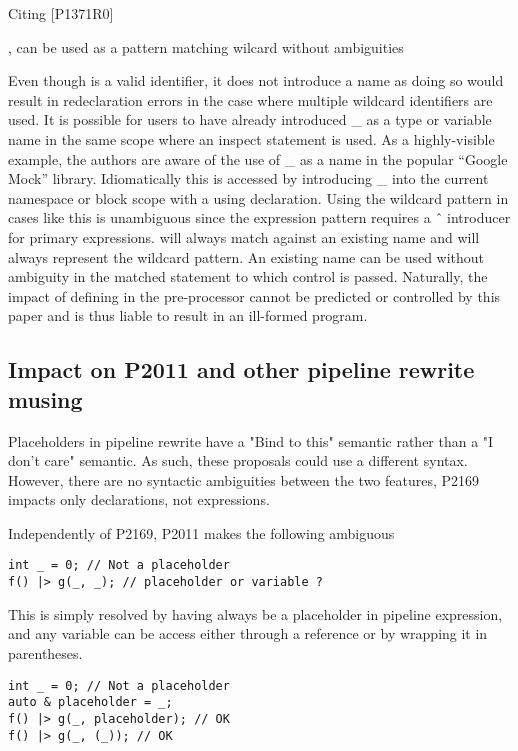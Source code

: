 \documentclass{wg21}
\begin{document}
Citing [P1371R0]{\cite{P1371R0}, \tcode{_} can be used as a pattern matching wilcard without ambiguities
    
\begin{quoteblock}
Even though \tcode{_} is a valid identifier, it does not introduce a name as doing so would result in redeclaration
errors in the case where multiple wildcard \tcode{_} identifiers are used.
It is possible for users to have already introduced _ as a type or variable name in the same scope where an
inspect statement is used. As a highly-visible example, the authors are aware of the use of _ as a name in
the popular “Google Mock” library. Idiomatically this is accessed by introducing _ into the current namespace
or block scope with a using declaration. Using the wildcard pattern in cases like this is unambiguous since
the expression pattern requires a ˆ introducer for primary expressions. \tcode{\^_} will always match against an
existing name and \tcode{_} will always represent the wildcard pattern. An existing \tcode{_} name can be used without
ambiguity in the matched statement to which control is passed.
Naturally, the impact of defining \tcode{_} in the pre-processor cannot be predicted or controlled by this paper and
is thus liable to result in an ill-formed program.
\end{quoteblock}

\subsection{Impact on P2011 and other pipeline rewrite musing}

Placeholders in pipeline rewrite have a "Bind to this" semantic rather than a "I don't care" semantic.
As such, these proposals could use a different syntax.
However, there are no syntactic ambiguities between the two features, P2169 impacts only declarations, not expressions.

Independently of P2169, P2011 makes the following ambiguous

\begin{lstlisting}[style=color]
int _ = 0; // Not a placeholder
f() |> g(_, _); // placeholder or variable ? 
\end{lstlisting}

This is simply resolved by having \tcode{_} always be a placeholder in pipeline expression,
and any \tcode{_} variable can be access either through a reference or by wrapping it in parentheses.

\begin{lstlisting}[style=color]
int _ = 0; // Not a placeholder
auto & placeholder = _;
f() |> g(_, placeholder); // OK
f() |> g(_, (_)); // OK
\end{lstlisting} 


}
\end{document}
